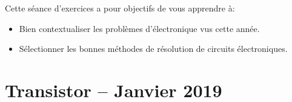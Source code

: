 \documentclass{../template/tp}
\author{The Fantastic Four}
\begin{document}


Cette séance d'exercices a pour objectifs de vous apprendre à:
\begin{itemize}
\item Bien contextualiser les problèmes d'électronique vus cette année.
\item Sélectionner les bonnes méthodes de résolution de circuits électroniques.
\end{itemize}


























\section*{Transistor -- Janvier 2019}
\end{document}
